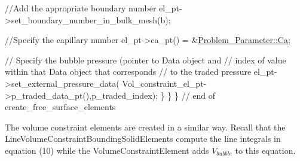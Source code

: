 \begin{DoxyCodeInclude}
     \textcolor{comment}{//Add the appropriate boundary number}
     el\_pt->set\_boundary\_number\_in\_bulk\_mesh(b);
     
     \textcolor{comment}{//Specify the capillary number}
     el\_pt->ca\_pt() = &\hyperlink{namespaceProblem__Parameter_af6194d2571881779c678fbabc1503d47}{Problem\_Parameter::Ca};

     \textcolor{comment}{// Specify the bubble pressure (pointer to Data object and }
     \textcolor{comment}{// index of value within that Data object that corresponds}
     \textcolor{comment}{// to the traded pressure}
     el\_pt->set\_external\_pressure\_data(
      Vol\_constraint\_el\_pt->p\_traded\_data\_pt(),p\_traded\_index); 
    \} 
  \}
\}
\textcolor{comment}{// end of create\_free\_surface\_elements}

\end{DoxyCodeInclude}


The volume constraint elements are created in a similar way. Recall that the {\ttfamily Line\+Volume\+Constraint\+Bounding\+Solid\+Elements} compute the line integrals in equation (10) while the {\ttfamily Volume\+Constraint\+Element} adds $ V_{bubble} $ to this equation.



